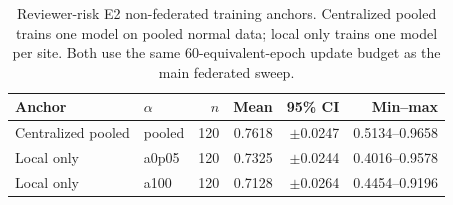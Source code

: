 \begin{table}[t]
\centering
\caption{Reviewer-risk E2 non-federated training anchors. Centralized pooled trains one model on pooled normal data; local only trains one model per site. Both use the same 60-equivalent-epoch update budget as the main federated sweep.}
\label{tab:p1-e2-training-anchors}
\scriptsize
\setlength{\tabcolsep}{2pt}
\begin{tabular}{@{}llrrrr@{}}
\toprule
Anchor & $\alpha$ & $n$ & Mean & 95\% CI & Min--max \\
\midrule
Centralized pooled & pooled & 120 & 0.7618 & $\pm$0.0247 & 0.5134--0.9658 \\
Local only & a0p05 & 120 & 0.7325 & $\pm$0.0244 & 0.4016--0.9578 \\
Local only & a100 & 120 & 0.7128 & $\pm$0.0264 & 0.4454--0.9196 \\
\bottomrule
\end{tabular}
\end{table}
